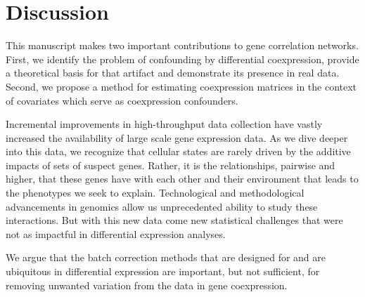 \section*{Discussion}

This manuscript makes two important contributions to gene correlation
networks. First, we identify the problem of confounding by differential
coexpression, provide a theoretical basis for that artifact and demonstrate
its presence in real data. Second, we propose a method for estimating
coexpression matrices in the context of covariates which serve as
coexpression confounders. 

Incremental improvements in high-throughput data collection have vastly
increased the availability of large scale gene expression data. As
we dive deeper into this data, we recognize that cellular states are
rarely driven by the additive impacts of sets of suspect genes. Rather,
it is the relationships, pairwise and higher, that these genes have
with each other and their environment that leads to the phenotypes
we seek to explain. Technological and methodological advancements
in genomics allow us unprecedented ability to study these interactions.
But with this new data come new statistical challenges that were not
as impactful in differential expression analyses. 

We argue that the batch correction methods that are designed for and
are ubiquitous in differential expression are important, but not sufficient,
for removing unwanted variation from the data in gene coexpression.

